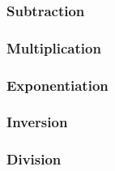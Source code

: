 
\subsubsection{Subtraction}

\subsubsection{Multiplication}

\subsubsection{Exponentiation}

\subsubsection{Inversion}

\subsubsection{Division}

